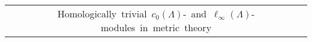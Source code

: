 \begin{scriptsize}
\begin{longtable}{|c|c|c|c|c|c|c|} 
\multicolumn{7}{c}{\mbox{Homologically trivial $c_0(\Lambda)$- and $\ell_\infty(\Lambda)$-modules in metric theory}}                                                                                                                                                                                                                                                                                                                                                                                                                                                                                                                                                                                                                                     \\
				 

\end{longtable}
\end{scriptsize}
